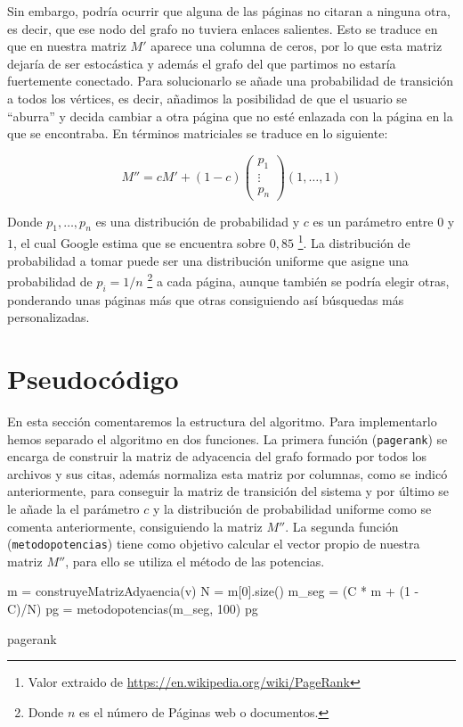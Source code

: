 \documentclass[size=a4, parskip=half, titlepage=false, toc=flat, toc=bib, 12pt, twoside]{scrartcl}
\theoremstyle{theorem-style}
\theoremstyle{definition-style}
\theoremstyle{remark-style}
\theoremstyle{example-style}
\theoremstyle{definition-style}
\theoremstyle{remark-style}
\begin{document}
Sin embargo, podría ocurrir que alguna de las páginas no citaran a ninguna otra, es decir, que ese nodo del grafo no tuviera enlaces salientes. Esto se traduce en que en nuestra matriz $M'$ aparece una columna de ceros, por lo que esta matriz dejaría de ser estocástica y además el grafo del que partimos no estaría fuertemente conectado. Para solucionarlo se añade una probabilidad de transición a todos los vértices, es decir, añadimos la posibilidad de que el usuario se ``aburra'' y decida cambiar a otra página que no esté enlazada con la página en la que se encontraba. En términos matriciales se traduce en lo siguiente:

$$M'' = cM' + (1-c)\begin{pmatrix}
p_1 \\
\vdots \\
p_n \end{pmatrix} (1, \dots, 1)$$

Donde $p_1, \dots , p_n$ es una distribución de probabilidad y $c$ es un parámetro entre $0$ y $1$, el cual Google estima que se encuentra sobre $0,85$ \footnote{Valor extraido de \url{https://en.wikipedia.org/wiki/PageRank}}. La distribución de probabilidad a tomar puede ser una distribución uniforme que asigne una probabilidad de $p_i = 1/n$ \footnote{Donde $n$ es el número de Páginas web o documentos.} a cada página, aunque también se podría elegir otras, ponderando unas páginas más que otras consiguiendo así búsquedas más personalizadas.

\newpage

\section{Pseudocódigo}
En esta sección comentaremos la estructura del algoritmo. Para implementarlo hemos separado el algoritmo en dos funciones. La primera función (\verb|pagerank|) se encarga de construir la matriz de adyacencia del grafo formado por todos los archivos y sus citas, además normaliza esta matriz por columnas, como se indicó anteriormente, para conseguir la matriz de transición del sistema y por último se le añade la el parámetro $c$ y la distribución de probabilidad uniforme como se comenta anteriormente, consiguiendo la matriz $M''$. La segunda función (\verb|metodopotencias|) tiene como objetivo calcular el vector propio de nuestra matriz $M''$, para ello se utiliza el método de las potencias.

\begin{algorithm}[H]
  m = construyeMatrizAdyaencia(v)\;
  N = m[0].size()\;
  m\_seg = (C * m + (1 - C)/N)\;
  pg = metodopotencias(m\_seg, 100)\;
  \Return pg
\caption{pagerank}
\end{algorithm}
\end{document}
